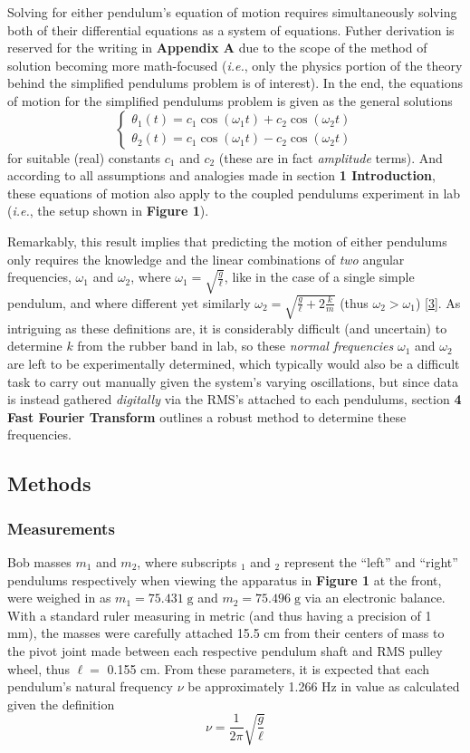 \documentclass[12pt]{article}
\newcommand{\g}{\;\mathrm{g}}
\begin{document}
\begin{multicols}{2}
Solving for either pendulum's equation of motion requires simultaneously solving both of their differential equations as a system of equations.
Futher derivation is reserved for the writing in \textbf{Appendix A} due to the scope of the method of solution becoming more math-focused
(\textit{i.e.}, only the physics portion of the theory behind the simplified pendulums problem is of interest). 
In the end, the equations of motion for the simplified pendulums problem is given as the general solutions
$$\left\{\begin{aligned}
    \theta_1(t) = c_1\cos(\omega_1t) + c_2\cos(\omega_2t) \\
    \theta_2(t) = c_1\cos(\omega_1t) - c_2\cos(\omega_2t)
\end{aligned}\right.$$
for suitable (real) constants $c_1$ and $c_2$ (these are in fact \textit{amplitude} terms).
And according to all assumptions and analogies made in section \textbf{1 Introduction}, these equations of motion also apply to the coupled pendulums experiment in lab
(\textit{i.e.}, the setup shown in \textbf{Figure 1}).

Remarkably, this result implies that predicting the motion of either pendulums only requires the knowledge and the linear combinations of \textit{two} angular frequencies, $\omega_1$ and $\omega_2$,
where $\displaystyle{\omega_1=\sqrt{\frac{g}{\ell}}}$, like in the case of a single simple pendulum, and where different yet similarly $\displaystyle{\omega_2=\sqrt{\frac{g}{\ell}+2\frac{k}{m}}}$
(thus $\omega_2>\omega_1$) [\hyperref[sec:3]{3}].
As intriguing as these definitions are, it is considerably difficult (and uncertain) to determine $k$ from the rubber band in lab,
so these \textit{normal frequencies} $\omega_1$ and $\omega_2$ are left to be experimentally determined,
which typically would also be a difficult task to carry out manually given the system's varying oscillations,
but since data is instead gathered \textit{digitally} via the RMS's attached to each pendulums,
section \textbf{4 Fast Fourier Transform} outlines a robust method to determine these frequencies.


\subsection{Methods}
\subsubsection{Measurements}
Bob masses $m_1$ and $m_2$, where subscripts $_1$ and $_2$ represent the ``left'' and ``right'' pendulums  respectively when viewing the apparatus in \textbf{Figure 1} at the front,
were weighed in as $m_1=75.431\g$ and $m_2=75.496\g$ via an electronic balance.
With a standard ruler measuring in metric (and thus having a precision of 1 mm), the masses were carefully attached 15.5 cm from their centers of mass to the pivot joint made between each respective pendulum shaft and RMS pulley wheel, thus $\ell=$ 0.155 cm.
From these parameters, it is expected that each pendulum's natural frequency $\nu$ be approximately 1.266 Hz in value as calculated given the definition
$$\nu = \frac{1}{2\pi}\sqrt{\frac{g}{\ell}}$$


\end{multicols}
\end{document}
